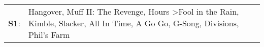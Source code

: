 \begin{supertabular}{p{0.03\textwidth}p{0.92\textwidth}}
 \textbf{S1}:  &  Hangover\textsuperscript{}, \enspace Muff II: The Revenge\textsuperscript{}, \enspace Hours\textsuperscript{} \textgreater \enspace Fool in the Rain\textsuperscript{}, \enspace Kimble\textsuperscript{}, \enspace Slacker\textsuperscript{}, \enspace All In Time\textsuperscript{}, \enspace A Go Go\textsuperscript{}, \enspace G-Song\textsuperscript{}, \enspace Divisions\textsuperscript{}, \enspace Phil's Farm\textsuperscript{}  \enspace  \\
\end{supertabular}
